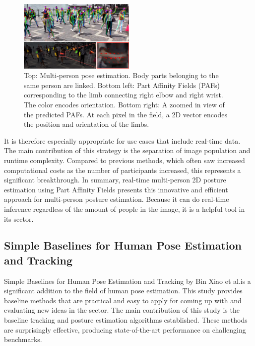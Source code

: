 \documentclass[runningheads]{llncs}
\begin{document}
        \begin{figure}[htbp]
            \centering
            \includegraphics[width=0.5\textwidth]{figures/multipose.png}
            \caption{Top: Multi-person pose estimation. Body parts belonging to the same person are linked. Bottom left: Part Affinity Fields (PAFs) corresponding to the limb connecting right elbow and right wrist. The color encodes orientation. Bottom right: A zoomed in view of the predicted PAFs. At each pixel in the field, a 2D vector encodes the position and orientation of the limbs.}
        \end{figure}

        It is therefore especially appropriate for use cases that include real-time data. The main contribution of this strategy is the separation of image population and runtime complexity. Compared to previous methods, which often saw increased computational costs as the number of participants increased, this represents a significant breakthrough. In summary, real-time multi-person 2D posture estimation using Part Affinity Fields presents this innovative and efficient approach for multi-person posture estimation. Because it can do real-time inference regardless of the amount of people in the image, it is a helpful tool in its sector. 

    \subsection{Simple Baselines for Human Pose Estimation and Tracking \parencite{xiao2018simplebaselineshumanpose}}
        Simple Baselines for Human Pose Estimation and Tracking by Bin Xiao et al.\@ is a significant addition to the field of human pose estimation. This study provides baseline methods that are practical and easy to apply for coming up with and evaluating new ideas in the sector.
        The main contribution of this study is the baseline tracking and posture estimation algorithms established. These methods are surprisingly effective, producing state-of-the-art performance on challenging benchmarks.\\
\end{document}
